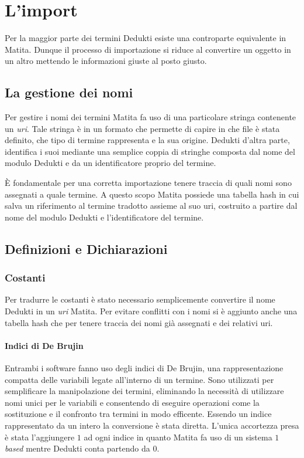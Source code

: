 \documentclass[12pt,a4paper]{report}
\begin{document}
\section{L'import}
Per la maggior parte dei termini Dedukti esiste una controparte equivalente in Matita.
Dunque il processo di importazione si riduce al convertire un oggetto in un altro
mettendo le informazioni giuste al posto giusto. %

\subsection{La gestione dei nomi}
Per gestire i nomi dei termini Matita fa uso di una particolare stringa contenente un 
\textit{uri}. Tale stringa è in un formato che permette di capire in che file è stata
definito, che tipo di termine rappresenta e la sua origine. Dedukti d'altra parte, identifica
i suoi mediante una semplice coppia di stringhe composta dal nome del modulo Dedukti
e da un identificatore proprio del termine. 

È fondamentale per una corretta importazione tenere traccia di quali nomi sono
assegnati a quale termine. A questo scopo Matita possiede una tabella hash in cui salva
un riferimento al termine tradotto assieme al suo uri, costruito a partire dal nome
del modulo Dedukti e l'identificatore del termine.


\subsection{Definizioni e Dichiarazioni}

\subsubsection{Costanti}
Per tradurre le costanti è stato necessario semplicemente convertire il nome
Dedukti in un \textit{uri} Matita. Per evitare conflitti con i nomi si è aggiunto
anche una tabella hash che per tenere traccia dei nomi già assegnati e dei 
relativi uri.

\paragraph{Indici di De Brujin}
Entrambi i software fanno uso degli indici di De Brujin, una rappresentazione
compatta delle variabili legate all'interno di un termine. Sono utilizzati per
semplificare la manipolazione dei termini, eliminando la necessità di utilizzare
nomi unici per le variabili e consentendo di eseguire operazioni come la 
sostituzione e il confronto tra termini in modo efficente. 
Essendo un indice rappresentato da un intero la conversione è stata diretta.
L'unica accortezza presa è stata l'aggiungere $1$ ad ogni indice in quanto
Matita fa uso di un sistema \textit{$1$ based} mentre Dedukti conta partendo
da $0$.
\end{document}
